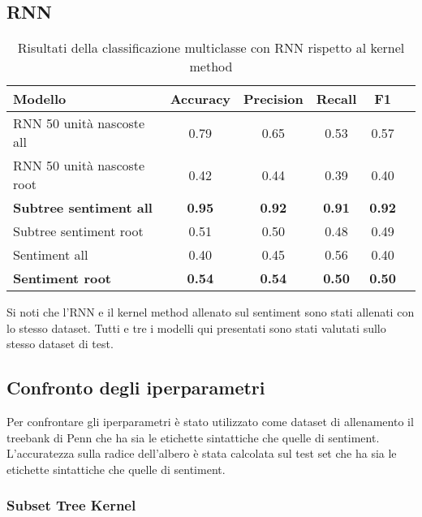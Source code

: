 \subsection{RNN}

\begin{table}[H]
    \centering
    \begin{tabular}{|l|c|c|c|c|c|}
    \hline
    Modello & Accuracy & Precision & Recall & F1 \\
    \hline
    RNN 50 unità nascoste all & 0.79 & 0.65 & 0.53 & 0.57 \\
    RNN 50 unità nascoste root & 0.42 & 0.44 & 0.39 & 0.40 \\
    \hline

    \textbf{Subtree sentiment all} & \textbf{0.95} & \textbf{0.92} &
        \textbf{0.91} & \textbf{0.92} \\
    Subtree sentiment root & 0.51 & 0.50 & 0.48 & 0.49 \\
    \hline

    Sentiment all & 0.40 & 0.45 & 0.56 & 0.40 \\
    \textbf{Sentiment root} & \textbf{0.54} & \textbf{0.54} & \textbf{0.50}
        & \textbf{0.50} \\
    \hline
    \end{tabular}
    \caption{Risultati della classificazione multiclasse con RNN rispetto al
    kernel method}
\end{table}
 
Si noti che l'RNN e il kernel method allenato sul sentiment sono stati allenati
con lo stesso dataset. Tutti e tre i modelli qui presentati sono
stati valutati sullo stesso dataset di test.

\subsection{Confronto degli iperparametri}

Per confrontare gli iperparametri è stato utilizzato come dataset di allenamento
il treebank di Penn che ha sia le etichette sintattiche che quelle di sentiment.
L'accuratezza sulla radice dell'albero è stata calcolata sul test set che ha
sia le etichette sintattiche che quelle di sentiment. 

\subsubsection{Subset Tree Kernel}

